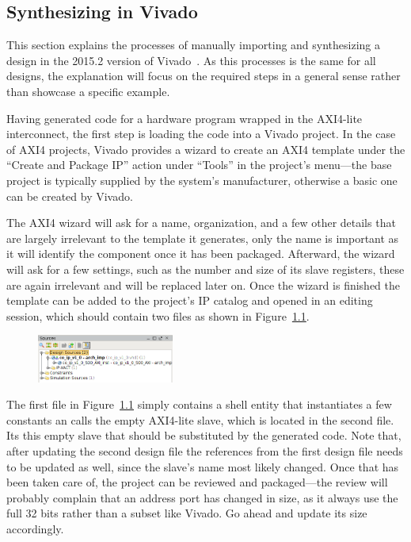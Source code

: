 \documentclass[licentiate,g5paper,gu]{chalmers-thesis}
\begin{document}
\begin{appendices}
\chapter{Synthesizing in Vivado}

This section explains the processes of manually importing and synthesizing a design in the 2015.2 version of Vivado~\cite{feist2012}. As this processes is the same for all designs, the explanation will focus on the required steps in a general sense rather than showcase a specific example.

Having generated code for a hardware program wrapped in the AXI4-lite interconnect, the first step is loading the code into a Vivado project. In the case of AXI4 projects, Vivado provides a wizard to create an AXI4 template under the  ``Create and Package IP'' action under ``Tools'' in the project's menu---the base project is typically supplied by the system's manufacturer, otherwise a basic one can be created by Vivado.

The AXI4 wizard will ask for a name, organization, and a few other details that are largely irrelevant to the template it generates, only the name is important as it will identify the component once it has been packaged. Afterward, the wizard will ask for a few settings, such as the number and size of its slave registers, these are again irrelevant and will be replaced later on. Once the wizard is finished the template can be added to the project's IP catalog and opened in an editing session, which should contain two files as shown in Figure~\ref{fig:files}.

\begin{figure}[h]
\includegraphics[width=0.4\textwidth]{figures/DesignFiles}
\centering
\caption{} %
\label{fig:files}
\end{figure}

The first file in Figure~\ref{fig:files} simply contains a shell entity that instantiates a few constants an calls the empty AXI4-lite slave, which is located in the second file. Its this empty slave that should be substituted by the generated code. Note that, after updating the second design file the references from the first design file needs to be updated as well, since the slave's name most likely changed. Once that has been taken care of, the project can be reviewed and packaged---the review will probably complain that an address port has changed in size, as it always use the full 32 bits rather than a subset like Vivado. Go ahead and update its size accordingly.


\end{appendices}
\end{document}
